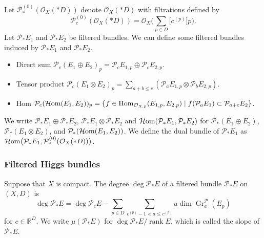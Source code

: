 \documentclass[pdftex]{sigma}
\numberwithin{equation}{section}
\newcommand{\R}{\mathbb{R}}
\newcommand{\rk}{\operatorname{rank}}
\newcommand{\Hom}{\operatorname{Hom}}
\newcommand{\sheafhom}{\operatorname{\mathcal{H}{\rm om}}}
\newcommand{\strsheaf}{\mathcal{O}}
\newcommand{\gr}{\operatorname{\mathrm{Gr}}}
\begin{document}
Let $\mathcal{P}_{*}^{(0)} (\strsheaf_{X} (*D))$ denote $\strsheaf_{X}(*D)$ with filtrations defined by
\[
\mathcal{P}_{c}^{(0)} (\strsheaf_{X}(*D)) = \strsheaf_{X} \biggl(\sum_{p\in D} \bigl[c^{(p)}\bigr]p\biggr).
\]
Let $\mathcal{P}_* E_1$ and $\mathcal{P}_* E_2$ be filtered bundles. We can define some filtered bundles induced by $\mathcal{P}_* E_1$ and $\mathcal{P}_* E_2$.
\begin{itemize}\itemsep=0pt
 \item Direct sum
$\mathcal{P}_{c}(E_1\oplus E_2)_p = \mathcal{P}_{c}E_{1,p} \oplus \mathcal{P}_{c}E_{2,p}$.
 \item Tensor product
$\mathcal{P}_{c}(E_1\otimes E_2)_p = \sum_{a+b\leq c} (\mathcal{P}_{a}E_{1,p} \otimes \mathcal{P}_{b}E_{2,p})$.
 \item Hom
$\mathcal{P}_{c}(\sheafhom(E_1,E_2))_p = \{f\in \Hom_{\strsheaf_{X,p}}(E_{1,p},E_{2,p})\mid f(\mathcal{P}_{a}E_{1})\subset\mathcal{P}_{a+c}E_{2} \}$.
\end{itemize}
We write $\mathcal{P}_{*}E_1\oplus \mathcal{P}_{*}E_2$, $\mathcal{P}_{*}E_1\otimes \mathcal{P}_{*}E_2$ and $\sheafhom(\mathcal{P}_{*} E_1,\mathcal{P}_{*} E_2)$ for $\mathcal{P}_{*}(E_1\oplus E_2)$, $\mathcal{P}_{*}(E_1\otimes E_2)$, and $\mathcal{P}_{*}(\sheafhom(E_1,E_2))$. We define the dual bundle of $\mathcal{P}_{*} E_{1}$ as $\sheafhom\bigl(\mathcal{P}_{*} E_1,\mathcal{P}_{*}^{(0)} (\strsheaf_{X} (*D))\bigr)$.

\subsubsection{Filtered Higgs bundles}
\begin{Definition}
 Suppose that $X$ is compact.
 The degree $\deg{\mathcal{P}_{*}E}$ of a filtered bundle $\mathcal{P}_{*} E$ on~$(X,D)$ is
 \[
 \deg{\mathcal{P}_{*}E} = \deg{\mathcal{P}_{c}E} - \sum_{p\in D}\sum_{c^{(p)}-1<a\leq c^{(p)}} a\dim\gr_{a}^{\mathcal{P}} (E_p)
 \]
for $c\in\R^D$. We write $\mu(\mathcal{P}_{*} E)$ for $\deg{\mathcal{P}_{*} E}/\rk{E}$, which is called the slope of $\mathcal{P}_{*} E$.
\end{Definition}
\end{document}
